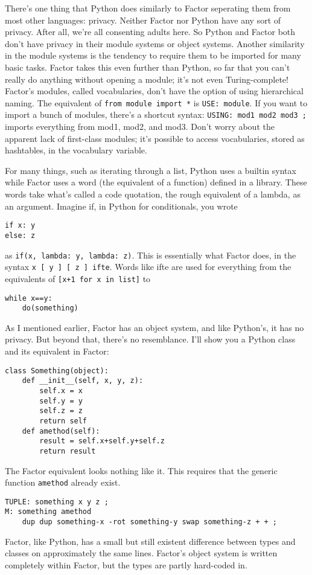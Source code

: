 \documentclass{article}
\begin{document}
There's one thing that Python does similarly to Factor seperating them from most other languages: privacy. Neither Factor nor Python have any sort of privacy. After all, we're all consenting adults here. So Python and Factor both don't have privacy in their module systems or object systems. Another similarity in the module systems is the tendency to require them to be imported for many basic tasks. Factor takes this even further than Python, so far that you can't really do anything without opening a module; it's not even Turing-complete! Factor's modules, called vocabularies, don't have the option of using hierarchical naming. The equivalent of \verb|from module import *| is \verb|USE: module|. If you want to import a bunch of modules, there's a shortcut syntax: \verb|USING: mod1 mod2 mod3 ;| imports everything from mod1, mod2, and mod3. Don't worry about the apparent lack of first-class modules; it's possible to access vocabularies, stored as hashtables, in the vocabulary variable.

For many things, such as iterating through a list, Python uses a builtin syntax while Factor uses a word (the equivalent of a function) defined in a library. These words take what's called a code quotation, the rough equivalent of a lambda, as an argument. Imagine if, in Python for conditionals, you wrote
\begin{verbatim}
if x: y
else: z
\end{verbatim}
as \verb|if(x, lambda: y, lambda: z)|. This is essentially what Factor does, in the syntax \verb|x [ y ] [ z ] ifte|. Words like ifte are used for everything from the equivalents of \verb|[x+1 for x in list]| to
\begin{verbatim}
while x==y:
    do(something)
\end{verbatim} 

As I mentioned earlier, Factor has an object system, and like Python's, it has no privacy. But beyond that, there's no resemblance. I'll show you a Python class and its equivalent in Factor:
\begin{verbatim}
class Something(object):
    def __init__(self, x, y, z):
        self.x = x
        self.y = y
        self.z = z
        return self
    def amethod(self):
        result = self.x+self.y+self.z
        return result
\end{verbatim}
The Factor equivalent looks nothing like it. This requires that the generic function \texttt{amethod} already exist.
\begin{verbatim}
TUPLE: something x y z ;
M: something amethod
    dup dup something-x -rot something-y swap something-z + + ;
\end{verbatim}
Factor, like Python, has a small but still existent difference between types and classes on approximately the same lines. Factor's object system is written completely within Factor, but the types are partly hard-coded in.
\end{document}
